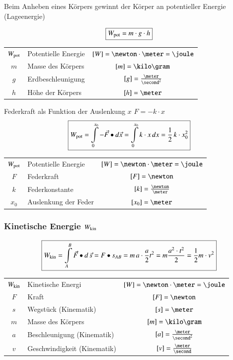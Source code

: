 Beim Anheben eines Körpers gewinnt der Körper an potentieller Energie (Lageenergie) 

$$ \boxed{ W_{\rm pot} = m \cdot g \cdot h} $$

\begin{tabular}{c l c}
	$W_{\rm pot}$ 	& Potentielle Energie	& $[W] = \newton \cdot \meter = \joule$ \\
	$m$ 			& Masse des Körpers 	& $[m] = \kilo \gram$ 					\\
	$g$ 			& Erdbeschleunigung 	& $[g] = \frac{\meter}{\second^2}$ 		\\
	$h$ 			& Höhe der Körpers 		& $[h] = \meter$
\end{tabular}



Federkraft als Funktion der Auslenkung $x$ \qquad $F = -k \cdot x$ 
$$ \boxed{ W_{\rm pot} = \int \limits_0^{x_0}  - \vec{F} \bullet d \vec{x} = \int \limits_0^{x_0}  k \cdot x \, dx = \frac{1}{2} \, k \cdot x_0^2} $$

\begin{tabular}{c l c}
	$W_{\rm pot}$ 	& Potentielle Energie 	& $[W] = \newton \cdot \meter = \joule$ \\
	$F$ 			& Federkraft 			& $[F] = \newton$ 						\\
	$k$ 			& Federkonstante 		& $[k] = \frac{\newton}{\meter}$ 		\\
	$x_0$ 			& Auslenkung der Feder 	& $[x_0] = \meter$	
\end{tabular}


\subsubsection{Kinetische Energie $W_{\rm kin}$}

$$ \boxed{ W_{\rm kin} = \int \limits_A^B \vec{F} \bullet d \, \vec{s} =  F \bullet s_{AB} = m \, a \cdot \frac{a}{2} t^2 = m \frac{a^2 \cdot t^2}{2} = \frac{1}{2} m \cdot v^2} $$


\begin{tabular}{c l c}
	$W_{\rm kin}$ 	& Kinetische Energi			 	& $[W] = \newton \cdot \meter = \joule$ \\
	$F$ 			& Kraft 						& $[F] = \newton$ 						\\
	$s$ 			& Wegstück (Kinematik) 			& $[s] = \meter$ 						\\
	$m$ 			& Masse des Körpers 			& $[m] = \kilo \gram$ 					\\
	$a$ 			& Beschleunigung (Kinematik) 	& $[a] = \frac{\meter}{\second^2}$ 		\\
	$v$ 			& Geschwindigkeit (Kinematik) 	& $[v] = \frac{\meter}{\second}$
\end{tabular}


